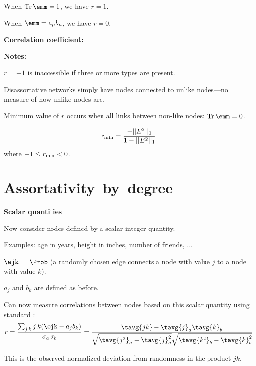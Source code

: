     When $\rm{Tr}\, \emm = 1$, we have $r=1$. \alert{\checkmark}
  
    When $\emm = a_{\mu} b_{\mu}$, we have $r=0$. \alert{\checkmark}
  


  \textbf{Correlation coefficient:}

  \textbf{Notes:}
  
  
    $r=-1$ is inaccessible if three or more types are present.
  
    Disassortative networks
    simply have nodes connected to unlike nodes---no measure
    of how unlike nodes are.
  
    Minimum value of $r$ occurs when all links between
    non-like nodes: $\rm{Tr}\, \emm = 0$.
  
    $$
    r_{\rm min}
    =
    \frac{
      - || E^2 ||_1
    }
    {
      1 - || E^2 ||_1
    }
    $$
    where $-1 \le r_{\rm min} < 0$.
  
  


\section{Assortativity\ by\ degree}

  \textbf{Scalar quantities}

  
  
    Now consider nodes defined by a scalar integer quantity.
  
    Examples: age in years, height in inches, number of friends, ...
  
    $\ejk$ = $\Prob$ (a randomly chosen edge connects a node with
    value $j$ to a node with value $k$).
  
    $a_{j}$ and $b_{k}$ are defined as before.
  
    Can now measure correlations between nodes based 
    on this scalar quantity using standard 
    :
    {
      $$
      r = 
      \frac{\sum_{j\, k} j\, k (\ejk - a_j b_k)}
      {\sigma_a\, \sigma_b}
      =
      \frac{
        \tavg{jk} - \tavg{j}_a\tavg{k}_b
      }
      {
        \sqrt{\tavg{j^2}_a - \tavg{j}_a^2}
        \sqrt{\tavg{k^2}_b - \tavg{k}_b^2}
      }
      $$
      }
    
      This is the observed normalized deviation from randomness
      in the product $jk$.
    


